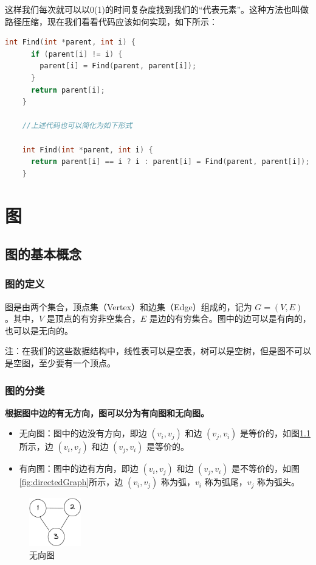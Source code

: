 \documentclass[lang=cn,newtx,10pt,scheme=chinese]{../elegantbook}
\begin{document}
  这样我们每次就可以以0(1)的时间复杂度找到我们的“代表元素”。这种方法也叫做路径压缩，现在我们看看代码应该如何实现，如下所示：

  \begin{lstlisting}[language=C++, caption={路径压缩}]
    int Find(int *parent, int i) {
      if (parent[i] != i) {
        parent[i] = Find(parent, parent[i]);
      }
      return parent[i];
    }

    //上述代码也可以简化为如下形式

    int Find(int *parent, int i) {
      return parent[i] == i ? i : parent[i] = Find(parent, parent[i]);
    }
  \end{lstlisting}
\chapter{图}

\section{图的基本概念}



\subsection{图的定义}
图是由两个集合，顶点集（Vertex）和边集（Edge）组成的，记为 $G = (V, E)$。其中，$V$ 是顶点的有穷非空集合，$E$ 是边的有穷集合。图中的边可以是有向的，也可以是无向的。

注：在我们的这些数据结构中，线性表可以是空表，树可以是空树，但是图不可以是空图，至少要有一个顶点。

\subsection{图的分类}

\textbf{根据图中边的有无方向，图可以分为有向图和无向图。}

\begin{itemize}
  \item 无向图：图中的边没有方向，即边 $(v_i, v_j)$ 和边 $(v_j, v_i)$ 是等价的，如图\ref{fig:undirectedGraph}所示，边 $(v_i, v_j)$ 和边 $(v_j, v_i)$ 是等价的。
  \item 有向图：图中的边有方向，即边 $(v_i, v_j)$ 和边 $(v_j, v_i)$ 是不等价的，如图\ref{fig:directedGraph}所示，边 $(v_i, v_j)$ 称为弧，$v_i$ 称为弧尾，$v_j$ 称为弧头。
  \end{itemize}

  \begin{figure}[h!]
    \centering
    \includegraphics[width=0.2\textwidth]{./figure/pdf/cropped/undirection.pdf}
    \caption{无向图}
    \label{fig:undirectedGraph}
  \end{figure}
\end{document}
